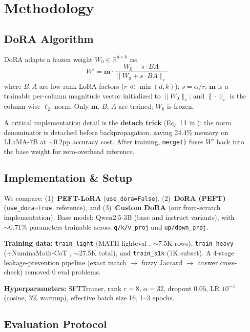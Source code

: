 \documentclass[11pt,twocolumn]{article}
\begin{document}
\section{Methodology}

\subsection{DoRA Algorithm}

DoRA adapts a frozen weight $W_0 \in \mathbb{R}^{d \times k}$ as:
\[
  W' = \mathbf{m} \cdot \frac{W_0 + s \cdot BA}{\|W_0 + s \cdot BA\|_c}
\]
where $B, A$ are low-rank LoRA factors ($r \ll \min(d,k)$); $s{=}\alpha/r$; $\mathbf{m}$ is a trainable per-column magnitude vector initialized to $\|W_0\|_c$; and $\|\cdot\|_c$ is the column-wise $\ell_2$ norm. Only $\mathbf{m}$, $B$, $A$ are trained; $W_0$ is frozen.

A critical implementation detail is the \textbf{detach trick} (Eq.~11 in \cite{liu2024dora}): the norm denominator is detached before backpropagation, saving 24.4\% memory on LLaMA-7B at $\sim$0.2pp accuracy cost. After training, \texttt{merge()} fuses $W'$ back into the base weight for zero-overhead inference.

\subsection{Implementation \& Setup}

We compare: (1)~\textbf{PEFT-LoRA} (\texttt{use\_dora=False}), (2)~\textbf{DoRA (PEFT)} (\texttt{use\_dora=True}, reference), and (3)~\textbf{Custom DoRA} (our from-scratch implementation). Base model: Qwen2.5-3B (base and instruct variants), with ${\sim}0.71\%$ parameters trainable across \texttt{q/k/v\_proj} and \texttt{up/down\_proj}.

\textbf{Training data:} \texttt{train\_light} (MATH-lighteval \cite{matheval}, $\sim$7.5K rows), \texttt{train\_heavy} (+NuminaMath-CoT \cite{numina}, $\sim$27.5K total), and \texttt{train\_s1k} (1K subset). A 4-stage leakage-prevention pipeline (exact match $\to$ fuzzy Jaccard $\to$ answer cross-check) removed 0 eval problems.

\textbf{Hyperparameters:} SFTTrainer, rank $r{=}8$, $\alpha{=}32$, dropout $0.05$, LR $10^{-4}$ (cosine, 3\% warmup), effective batch size 16, 1--3 epochs.

\subsection{Evaluation Protocol}
\end{document}
